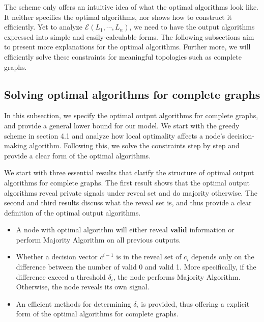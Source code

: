 \documentclass[a4paper,UKenglish]{lipics}
\theoremstyle{definition}
\begin{document}
The scheme only offers an intuitive idea of what the optimal algorithms look like.
It neither specifies the optimal algorithms, nor shows how to construct it efficiently.  
Yet to analyze $\mathcal{E}(L_1, \dotsb, L_n)$, we need to have the output algorithms expressed into simple and easily-calculable forms. 
The following subsections aim to present more explanations for the optimal algorithms. 
Further more, we will efficiently solve these constraints for meaningful topologies such as complete graphs.


\subsection {Solving optimal algorithms for complete graphs}
In this subsection, we specify the optimal output algorithms for complete graphs,
	and provide a general lower bound for our model.
We start with the greedy scheme in section 4.1 and analyze how local optimality affects a node's decision-making algorithm.
Following this, we solve the constraints step by step and provide a clear form of the optimal algorithms.

We start with three essential results that clarify the structure of optimal output algorithms for complete graphs.
The first result shows that the optimal output algorithms reveal private signals under reveal set and do majority otherwise.
The second and third results discuss what the reveal set is, and thus provide a clear definition of the optimal output algorithms.
\begin{itemize}
\item A node with optimal algorithm will either reveal \textbf{valid} information or perform Majority Algorithm on all previous outputs.
\item Whether a decision vector $c^{i-1}$ is in the reveal set of $c_i$ depends only on the difference between the number of valid 0 and valid 1.
	More specifically, if the difference exceed a threshold $\delta_i$, the node performs Majority Algorithm.
	Otherwise, the node reveals its own signal.
\item An efficient methods for determining $\delta_i$ is provided, thus offering a explicit form of the optimal algorithms for complete graphs.
\end{itemize}
\end{document}
